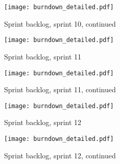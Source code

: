 \begin{figure}[h!]
    \centering
	\texttt{[image: burndown\_detailed.pdf]}
	\caption{Sprint backlog, sprint 10, continued}
	\end{figure}

\begin{figure}[h!]
    \centering
	\texttt{[image: burndown\_detailed.pdf]}
    \caption{Sprint backlog, sprint 11}
	\end{figure}

\begin{figure}[h!]
    \centering
	\texttt{[image: burndown\_detailed.pdf]}
	\caption{Sprint backlog, sprint 11, continued}
	\end{figure}

\begin{figure}[h!]
    \centering
	\texttt{[image: burndown\_detailed.pdf]}
	\caption{Sprint backlog, sprint 12}
	\end{figure}

\begin{figure}[h!]
    \centering
	\texttt{[image: burndown\_detailed.pdf]}
	\caption{Sprint backlog, sprint 12, continued}
	\end{figure}
